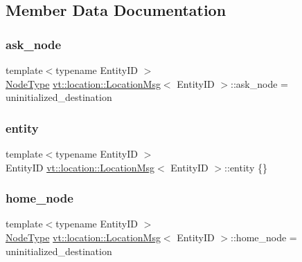 \subsection{Member Data Documentation}
\mbox{\label{structvt_1_1location_1_1_location_msg_ab99a70172011e251d4abec4f2110fc08}} 
\subsubsection{\texorpdfstring{ask\+\_\+node}{ask\_node}}
{\footnotesize\ttfamily template$<$typename Entity\+ID $>$ \\
\hyperlink{namespacevt_a866da9d0efc19c0a1ce79e9e492f47e2}{Node\+Type} \hyperlink{structvt_1_1location_1_1_location_msg}{vt\+::location\+::\+Location\+Msg}$<$ Entity\+ID $>$\+::ask\+\_\+node = uninitialized\+\_\+destination}

\mbox{\label{structvt_1_1location_1_1_location_msg_ab87a163a9f9f15780898870e0cba9b0e}} 
\subsubsection{\texorpdfstring{entity}{entity}}
{\footnotesize\ttfamily template$<$typename Entity\+ID $>$ \\
Entity\+ID \hyperlink{structvt_1_1location_1_1_location_msg}{vt\+::location\+::\+Location\+Msg}$<$ Entity\+ID $>$\+::entity \{\}}

\mbox{\label{structvt_1_1location_1_1_location_msg_a66a5eb7dc3383f583b04d2ecf66c7222}} 
\subsubsection{\texorpdfstring{home\+\_\+node}{home\_node}}
{\footnotesize\ttfamily template$<$typename Entity\+ID $>$ \\
\hyperlink{namespacevt_a866da9d0efc19c0a1ce79e9e492f47e2}{Node\+Type} \hyperlink{structvt_1_1location_1_1_location_msg}{vt\+::location\+::\+Location\+Msg}$<$ Entity\+ID $>$\+::home\+\_\+node = uninitialized\+\_\+destination}

